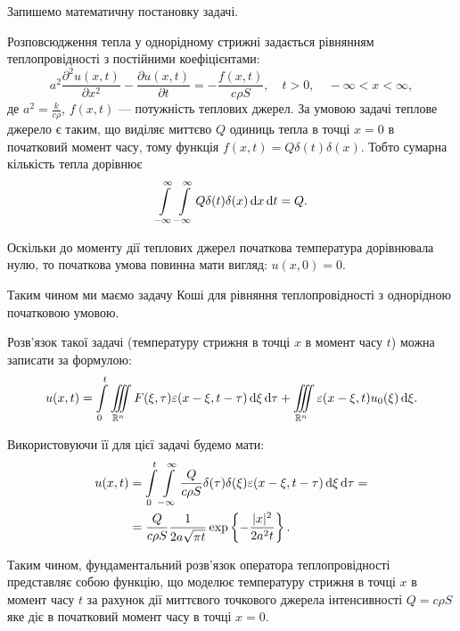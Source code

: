 \begin{solution}
	Запишемо математичну постановку задачі. \medskip

	Розповсюдження тепла у однорідному стрижні задається рівнянням теплопровідності з постійними коефіцієнтами:
	\begin{equation}
		a^2 \frac{\partial^2 u(x, t)}{\partial x^2} - \frac{\partial u(x, t)}{\partial t} = - \frac{f(x, t)}{c \rho S}, \quad t > 0, \quad - \infty < x < \infty,
	\end{equation}
	де $a^2 = \frac{k}{c \rho}$, $f(x, t)$ --- потужність теплових джерел. За умовою задачі теплове джерело є таким, що виділяє миттєво $Q$ одиниць тепла в точці $x = 0$ в початковий момент часу, тому функція $f(x, t) = Q \delta(t) \delta (x)$. Тобто сумарна кількість тепла дорівнює  
	\begin{equation}
		\displaystyle\int\limits_{-\infty}^\infty \displaystyle\int\limits_{-\infty}^\infty Q \delta(t) \delta (x) \mathop{}\!\mathrm{d} x \mathop{}\!\mathrm{d} t = Q.
	\end{equation}

	Оскільки до моменту дії теплових джерел початкова температура дорівнювала нулю, то початкова умова повинна мати вигляд:  $u(x, 0) = 0$. \medskip

	Таким чином ми маємо задачу Коші для рівняння теплопровідності з однорідною початковою умовою. \medskip

	Розв'язок такої задачі (температуру стрижня в точці $x$ в момент часу $t$) можна записати за формулою: 
  	\begin{equation}
  		u(x, t) = \displaystyle\int\limits_0^t \displaystyle\iiint\limits_{\mathbb{R}^n} F(\xi, \tau) \varepsilon(x - \xi, t - \tau) \mathop{}\!\mathrm{d} \xi \mathop{}\!\mathrm{d} \tau + \displaystyle\iiint\limits_{\mathbb{R}^n} \varepsilon(x - \xi, t) u_0(\xi) \mathop{}\!\mathrm{d} \xi.
  	\end{equation}

	Використовуючи її для цієї задачі будемо мати:
 	\begin{equation}
 		\begin{aligned}
 			u(x, t) &= \displaystyle\int\limits_0^t \displaystyle\int\limits_{-\infty}^\infty \frac{Q}{c \rho S} \delta(\tau) \delta (\xi) \varepsilon(x - \xi, t - \tau) \mathop{}\!\mathrm{d} \xi \mathop{}\!\mathrm{d} \tau = \\
 			&= \frac{Q}{c \rho S} \frac{1}{2 a \sqrt{\pi t}} \exp\left\{ - \frac{|x|^2}{2 a^2 t} \right\}.
 		\end{aligned}
 	\end{equation}

	Таким чином, фундаментальний розв'язок оператора теплопровідності представляє собою функцію, що моделює температуру стрижня в точці $x$ в момент часу $t$ за рахунок дії миттєвого точкового джерела інтенсивності $Q = c \rho S$ яке діє в початковий момент часу в точці $x = 0$. \medskip


\end{solution}
